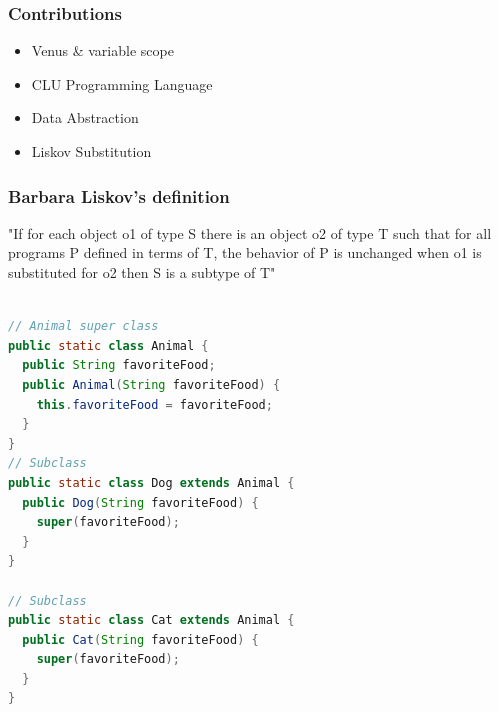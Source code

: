 \documentclass{beamer}
\begin{document}

\begin{frame}
\frametitle{Contributions}

\begin{itemize}

\item Venus \& variable scope
\item CLU Programming Language
\item Data Abstraction
\item Liskov Substitution
\end{itemize}
\end{frame}


\begin{frame}
\frametitle{Barbara Liskov's definition}
"If for each object o1 of type S there is an object o2 of type T such that for all programs P defined in terms of T, the behavior of P is unchanged when o1 is substituted for o2 then S is a subtype of T"
\end{frame}




\vspace{5mm}

\begin{lstlisting}[language=Java]

// Animal super class 
public static class Animal {
  public String favoriteFood;
  public Animal(String favoriteFood) {
    this.favoriteFood = favoriteFood;
  }
}
// Subclass
public static class Dog extends Animal {
  public Dog(String favoriteFood) {
    super(favoriteFood);
  }
}

// Subclass
public static class Cat extends Animal {
  public Cat(String favoriteFood) {
    super(favoriteFood);
  }
}
\end{lstlisting}

\vspace{5mm}



\vspace{5mm}
\end{document}
